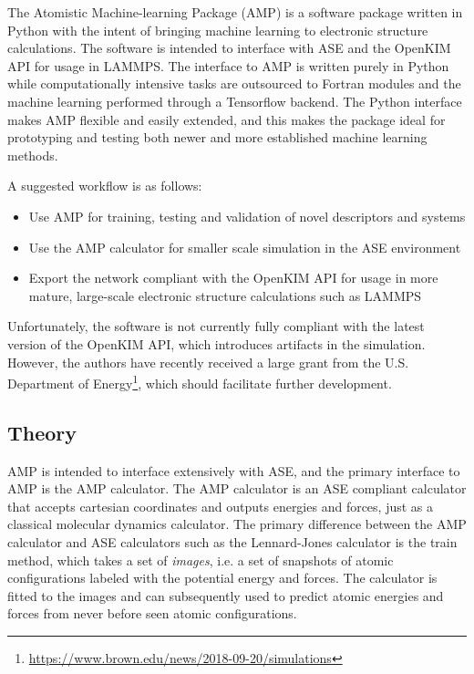 The Atomistic Machine-learning Package (AMP) is a software package
written in Python with the intent of bringing machine learning
to electronic structure calculations. The software is intended
to interface with ASE and the OpenKIM API for usage
in LAMMPS. The interface to AMP is written purely in Python
while computationally intensive tasks are outsourced to Fortran
modules and the machine learning performed through a Tensorflow
backend. The Python interface makes AMP flexible and easily
extended, and this makes the package ideal for prototyping
and testing both newer and more established machine learning
methods.
\par
A suggested workflow is as follows:

\begin{itemize}
    \item Use AMP for training, testing and validation
        of novel descriptors and systems
    \item Use the AMP calculator for smaller scale
        simulation in the ASE environment
    \item Export the network compliant with the OpenKIM
        API for usage in more mature, large-scale
        electronic structure calculations such as LAMMPS
\end{itemize}

Unfortunately, the software is not currently fully compliant
with the latest version of the OpenKIM API,
which introduces artifacts in the simulation.
However, the authors have recently received a large grant
from the U.S. Department of Energy\footnote{\url{
https://www.brown.edu/news/2018-09-20/simulations}}, 
which should facilitate further development.

\subsection{Theory}
AMP is intended to interface extensively with ASE,
and the primary interface to AMP is the AMP calculator.
The AMP calculator is an ASE compliant calculator
that accepts cartesian coordinates and outputs energies
and forces, just as a classical molecular dynamics calculator.
The primary difference between the AMP calculator
and ASE calculators such as the Lennard-Jones calculator
is the train method, which takes a set of \textit{images}, i.e.
a set of snapshots of atomic configurations labeled
with the potential energy and forces.
The calculator is fitted to the images and can subsequently
used to predict atomic energies and forces from never before seen
atomic configurations.


